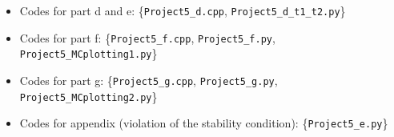 \documentclass[a4paper, 11pt, notitlepage,english]{article}
\begin{document}
\begin{itemize}
\item Codes for part d and e: \{\texttt{Project5\_d.cpp}, \texttt{Project5\_d\_t1\_t2.py}\}

\item Codes for part f: \{\texttt{Project5\_f.cpp}, \texttt{Project5\_f.py}, \texttt{Project5\_MCplotting1.py}\}

\item Codes for part g: \{\texttt{Project5\_g.cpp}, \texttt{Project5\_g.py}, \texttt{Project5\_MCplotting2.py}\}

\item Codes for appendix (violation of the stability condition): \{\texttt{Project5\_e.py}\}
\end{itemize}

 
 
\end{document}
